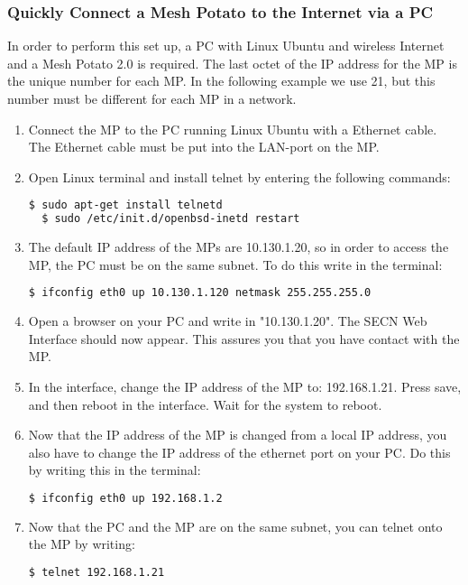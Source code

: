 \subsubsection{Quickly Connect a Mesh Potato to the Internet via a PC}

In order to perform this set up, a PC with Linux Ubuntu and wireless Internet and a Mesh Potato 2.0 is required. The last octet of the IP address for the MP is the unique number for each MP. In the following example we use 21, but this number must be different for each MP in a network. 

\begin{enumerate}
\item Connect the MP to the PC running Linux Ubuntu with a Ethernet cable. The Ethernet cable must be put into the LAN-port on the MP. 
\item Open Linux terminal and install telnet by entering the following commands: 
\noindent
\begin{lstlisting}[language=bash]
  $ sudo apt-get install telnetd
  $ sudo /etc/init.d/openbsd-inetd restart 
\end{lstlisting}
\item The default IP address of the MPs are 10.130.1.20, so in order to access the MP, the PC must be on the same subnet. To do this write in the terminal: 
\noindent
\begin{lstlisting}[language=bash]
  $ ifconfig eth0 up 10.130.1.120 netmask 255.255.255.0
\end{lstlisting}
\item Open a browser on your PC and write in "10.130.1.20". The SECN Web Interface should now appear. This assures you that you have contact with the MP.
\item In the interface, change the IP address of the MP to: 192.168.1.21. Press save, and then reboot in the interface. Wait for the system to reboot. 
\item Now that the IP address of the MP is changed from a local IP address, you also have to change the IP address of the ethernet port on your PC. Do this by writing this in the terminal:
\noindent
\begin{lstlisting}[language=bash]
  $ ifconfig eth0 up 192.168.1.2
\end{lstlisting}
\item Now that the PC and the MP are on the same subnet, you can telnet onto the MP by writing: 
\noindent
\begin{lstlisting}[language=bash]
  $ telnet 192.168.1.21

\end{lstlisting}
\end{enumerate}

